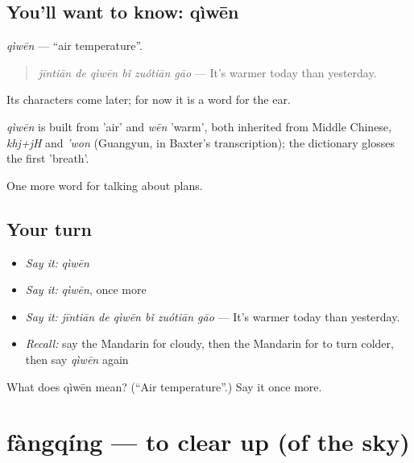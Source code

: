 \subsection*{You'll want to know: qìwēn}
\emph{qìwēn} — \textquotedblleft{}air temperature\textquotedblright{}.

\begin{quote}
\emph{jīntiān de qìwēn bǐ zuótiān gāo} — It's warmer today than yesterday.
\end{quote}

Its characters come later; for now it is a word for the ear.

\begin{cousinweb}
\emph{qìwēn} is built from  'air' and \emph{wēn} 'warm', both inherited from Middle Chinese, \emph{khj+jH} and \emph{'won} (Guangyun, in Baxter's transcription); the dictionary glosses the first 'breath'.
\end{cousinweb}

\begin{grammarlens}[title={What you've built}]
One more word for talking about plans.
\end{grammarlens}

\subsection*{Your turn}
\begin{itemize}
\raggedright
  \item \emph{Say it:} \emph{qìwēn}
  \item \emph{Say it:} \emph{qìwēn}, once more
  \item \emph{Say it:} \emph{jīntiān de qìwēn bǐ zuótiān gāo} — It's warmer today than yesterday.
  \item \emph{Recall:} say the Mandarin for cloudy, then the Mandarin for to turn colder, then say \emph{qìwēn} again
\end{itemize}

\begin{tcolorbox}[breakable,colback=teal!4,colframe=teal!35!black,title={Before you move on}]
What does qìwēn mean? (\textquotedblleft{}Air temperature\textquotedblright{}.) Say it once more.
\end{tcolorbox}
\section[fàngqíng]{fàngqíng — to clear up (of the sky)}

\label{lesson:ZH-C219-fangqing}



